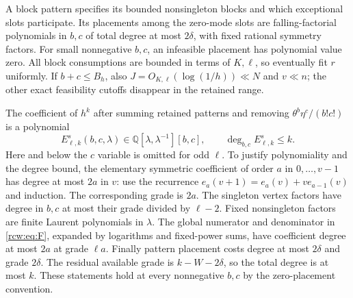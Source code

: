 \documentclass[11pt]{article}
\theoremstyle{definition}\newtheorem{definition}[theorem]{Definition}
\theoremstyle{remark}\newtheorem{remark}[theorem]{Remark}
\newcommand{\Q}{\mathbb Q}
\numberwithin{equation}{section}
\begin{document}
A block pattern specifies its bounded nonsingleton blocks and which exceptional slots participate. Its placements among the zero-mode slots are falling-factorial polynomials in $b,c$ of total degree at most $2\delta$, with fixed rational symmetry factors. For small nonnegative $b,c$, an infeasible placement has polynomial value zero. All block consumptions are bounded in terms of $K,\ell$, so eventually fit $r$ uniformly. If $b+c\le B_h$, also $J=O_{K,\ell}(\log(1/h))\ll N$ and $v\ll n$; the other exact feasibility cutoffs disappear in the retained range.

The coefficient of $h^k$ after summing retained patterns and removing $\theta^b\eta^c/(b!c!)$ is a polynomial
\begin{equation}\label{rcw:eq:Ek}
 E^s_{\ell,k}(b,c,\lambda)\in\Q[\lambda,\lambda^{-1}][b,c],
 \qquad \deg_{b,c}E^s_{\ell,k}\le k.
\end{equation}
Here and below the $c$ variable is omitted for odd $\ell$. To justify polynomiality and the degree bound, the elementary symmetric coefficient of order $a$ in $0,\ldots,v-1$ has degree at most $2a$ in $v$: use the recurrence $e_a(v+1)=e_a(v)+v e_{a-1}(v)$ and induction. The corresponding grade is $2a$. The singleton vertex factors have degree in $b,c$ at most their grade divided by $\ell-2$. Fixed nonsingleton factors are finite Laurent polynomials in $\lambda$. The global numerator and denominator in \eqref{rcw:eq:F}, expanded by logarithms and fixed-power sums, have coefficient degree at most $2a$ at grade $\ell a$. Finally pattern placement costs degree at most $2\delta$ and grade $2\delta$. The residual available grade is $k-W-2\delta$, so the total degree is at most $k$. These statements hold at every nonnegative $b,c$ by the zero-placement convention.
\end{document}

